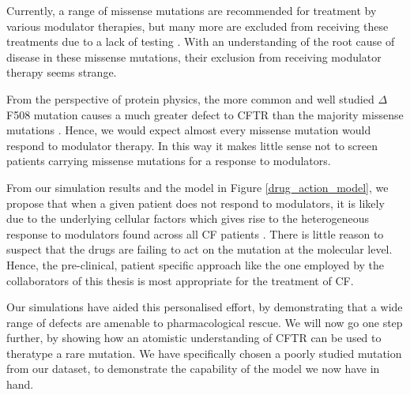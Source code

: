 Currently, a range of missense mutations are recommended for treatment by various modulator therapies, but many more are excluded from receiving these treatments due to a lack of testing \cite{trikafta_FDA_info, kalydeco_FDA_approval, vangoor2014}. With an understanding of the root cause of disease in these missense mutations, their exclusion from receiving modulator therapy seems strange.

From the perspective of protein physics, the more common and well studied $\Delta$F508 mutation causes a much greater defect to CFTR than the majority missense mutations \cite{bahia2021}. Hence, we would expect almost every missense mutation would respond to modulator therapy. In this way it makes little sense not to screen patients carrying missense mutations for a response to modulators. 

From our simulation results and the model in Figure \ref{drug_action_model}, we propose that when a given patient does not respond to modulators, it is likely due to the underlying cellular factors which gives rise to the heterogeneous response to modulators found across all CF patients \cite{boyle2014, donaldson2018, keating2018, matthes2018}. There is little reason to suspect that the drugs are failing to act on the mutation at the molecular level. Hence, the pre-clinical, patient specific approach like the one employed by the collaborators of this thesis is most appropriate for the treatment of CF. 


Our simulations have aided this personalised effort, by demonstrating that a wide range of defects are amenable to pharmacological rescue. We will now go one step further, by showing how an atomistic understanding of CFTR can be used to theratype a rare mutation. We have specifically chosen a poorly studied mutation from our dataset, to demonstrate the capability of the model we now have in hand. 

